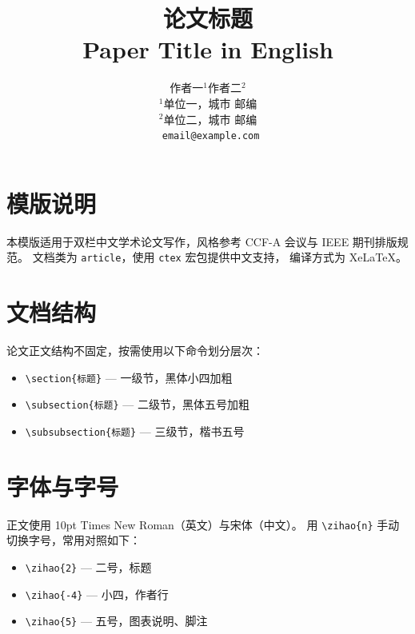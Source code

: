 \documentclass[10pt, twocolumn, a4paper]{article}
\title{
  \vspace{-1em}
  {\heiti\zihao{2} 论文标题}\\[4pt]
  {\zihao{-4} Paper Title in English}
}
\author{
  \zihao{-4}
  作者一$^{1}$\quad 作者二$^{2}$\\[2pt]
  \zihao{5}
  $^{1}$单位一，城市 邮编\\
  $^{2}$单位二，城市 邮编\\[2pt]
  \texttt{\zihao{5} email@example.com}
}
\date{}
\begin{document}
\maketitle
\thispagestyle{fancy}

\section{模版说明}

本模版适用于双栏中文学术论文写作，风格参考 CCF-A 会议与 IEEE 期刊排版规范。
文档类为 \texttt{article}，使用 \texttt{ctex} 宏包提供中文支持，
编译方式为 XeLaTeX。

\section{文档结构}

论文正文结构不固定，按需使用以下命令划分层次：

\begin{itemize}
  \item \verb|\section{标题}| — 一级节，黑体小四加粗
  \item \verb|\subsection{标题}| — 二级节，黑体五号加粗
  \item \verb|\subsubsection{标题}| — 三级节，楷书五号
\end{itemize}

\section{字体与字号}

正文使用 10pt Times New Roman（英文）与宋体（中文）。
用 \verb|\zihao{n}| 手动切换字号，常用对照如下：

\begin{itemize}
  \item \verb|\zihao{2}| — 二号，标题
  \item \verb|\zihao{-4}| — 小四，作者行
  \item \verb|\zihao{5}| — 五号，图表说明、脚注
\end{itemize}
\end{document}
